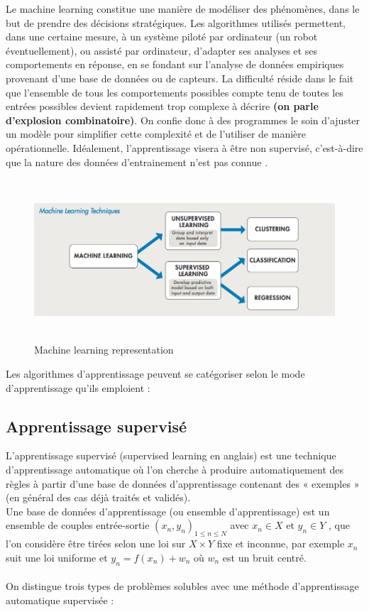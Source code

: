 \documentclass[12pt, french]{report}
\begin{document}
Le machine learning constitue une manière de modéliser des phénomènes, dans le but de prendre des décisions stratégiques. Les algorithmes utilisés permettent, dans une certaine mesure, à un système piloté par ordinateur (un robot éventuellement), ou assisté par ordinateur, d'adapter ses analyses et ses comportements en réponse, en se fondant sur l'analyse de données empiriques provenant d'une base de données ou de capteurs. La difficulté réside dans le fait que l'ensemble de tous les comportements possibles compte tenu de toutes les entrées possibles devient rapidement trop complexe à décrire \textbf{(on parle d'explosion combinatoire)}. On confie donc à des programmes le soin d'ajuster un modèle pour simplifier cette complexité et de l'utiliser de manière opérationnelle. Idéalement, l'apprentissage visera à être non supervisé, c'est-à-dire que la nature des données d'entrainement n'est pas connue \cite{key13}.
\begin{figure}[h]
\includegraphics[width=15cm, height=6cm]{images/machinelearning.png}
\caption{Machine learning representation}
\label{machinelearning}
\end{figure}

Les algorithmes d'apprentissage peuvent se catégoriser selon le mode d'apprentissage qu'ils emploient :

\subsection{Apprentissage supervisé}
L'apprentissage supervisé (supervised learning en anglais) est une technique d'apprentissage automatique où l'on cherche à produire automatiquement des règles à partir d'une base de données d'apprentissage contenant des « exemples » (en général des cas déjà traités et validés).\\
Une base de données d'apprentissage (ou ensemble d'apprentissage) est un ensemble de couples entrée-sortie $(x_n, y_n)_{1 \leq n \leq N}$ avec $x_n \in X$ et $y_n \in Y $  , que l'on considère être tirées selon une loi sur $ X \times Y $ fixe et inconnue, par exemple $x_n$ suit une loi uniforme et $ y_n = f(x_n) + w_n$ où $w_n$ est un bruit centré. \\\\
On distingue trois types de problèmes solubles avec une méthode d'apprentissage automatique supervisée \cite{key14}:  
\end{document}
